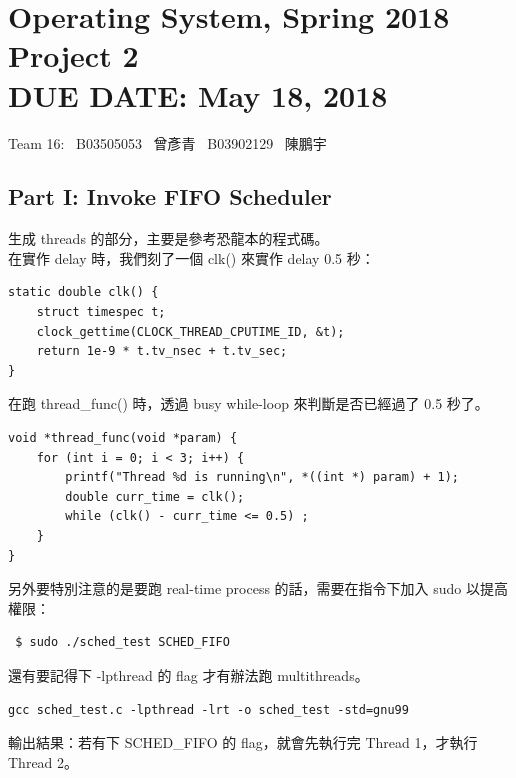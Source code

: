 \documentclass{article}
\newcommand{\hmwkClass}{Operating System, Spring 2018}
\newcommand{\hmwkTitle}{Project 2}
\newcommand{\hmwkDueDate}{May 18, 2018}
\begin{document}
\thispagestyle{empty}
\section*{\hmwkClass \\
    \normalsize{\hmwkTitle} \\
    \normalsize{DUE DATE: \hmwkDueDate}
}

\hfill{Team 16: \, B03505053 \, 曾彥青 \, B03902129 \, 陳鵬宇} \\

\subsection*{Part I: Invoke FIFO Scheduler}

生成 threads 的部分，主要是參考恐龍本的程式碼。\\

在實作 delay 時，我們刻了一個 clk() 來實作 delay 0.5 秒：

\lstset{basicstyle=\footnotesize\ttfamily, breaklines=true}
\begin{lstlisting}
static double clk() {
    struct timespec t;
    clock_gettime(CLOCK_THREAD_CPUTIME_ID, &t);
    return 1e-9 * t.tv_nsec + t.tv_sec;
}
\end{lstlisting}

在跑 thread\_func() 時，透過 busy while-loop 來判斷是否已經過了 0.5 秒了。

\begin{lstlisting}
void *thread_func(void *param) {
    for (int i = 0; i < 3; i++) {
        printf("Thread %d is running\n", *((int *) param) + 1);
        double curr_time = clk();
        while (clk() - curr_time <= 0.5) ;
    }
}
\end{lstlisting}

另外要特別注意的是要跑 real-time process 的話，需要在指令下加入 sudo 以提高權限：

\begin{lstlisting}
 $ sudo ./sched_test SCHED_FIFO
\end{lstlisting}

還有要記得下 -lpthread 的 flag 才有辦法跑 multithreads。

\begin{lstlisting}
gcc sched_test.c -lpthread -lrt -o sched_test -std=gnu99
\end{lstlisting}

輸出結果：若有下 SCHED\_FIFO 的 flag，就會先執行完 Thread 1，才執行 Thread 2。
\end{document}
